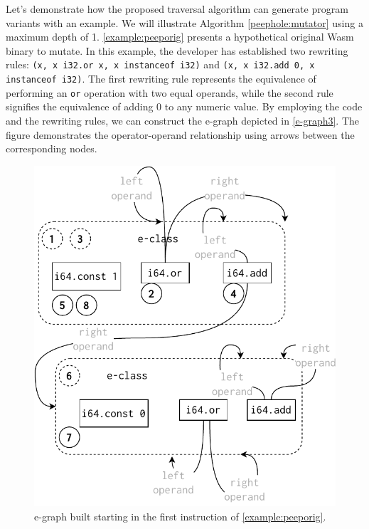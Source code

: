 \documentclass[sigplan,screen]{acmart}
\begin{document}
Let's demonstrate how the proposed traversal algorithm can generate program variants with an example. 
We will illustrate Algorithm \ref{peephole:mutator} using a maximum depth of 1. 
\autoref{example:peeporig} presents a hypothetical original Wasm binary to mutate. 
In this example, the developer has established two rewriting rules: \texttt{(x, x i32.or x, x instanceof i32)} and \texttt{(x, x i32.add 0, x instanceof i32)}. The first rewriting rule represents the equivalence of performing an \texttt{or} operation with two equal operands, while the second rule signifies the equivalence of adding 0 to any numeric value.
By employing the code and the rewriting rules, we can construct the e-graph depicted in \autoref{e-graph3}. The figure demonstrates the operator-operand relationship using arrows between the corresponding nodes.





\begin{figure}
    \centering
    \includegraphics[width=0.75\linewidth]{figures/egraph3.pdf}
    \caption{e-graph built starting in the first instruction of \autoref{example:peeporig}. }
  \label{e-graph3}
\end{figure}
\end{document}
